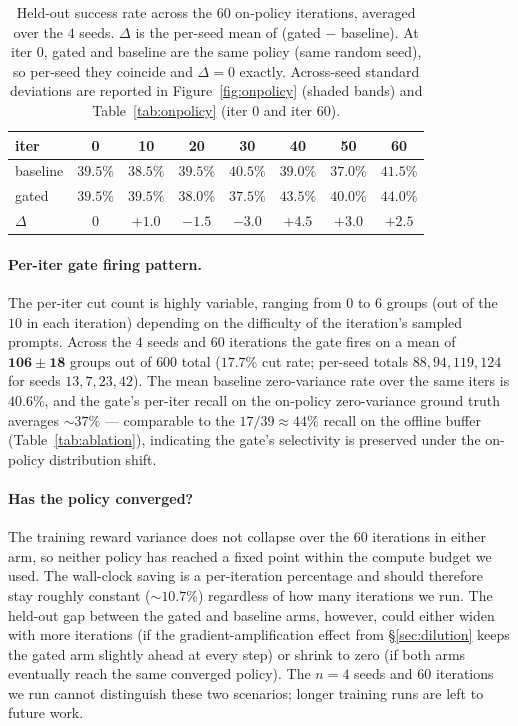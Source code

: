 \documentclass{article}
\begin{document}
\begin{table}[h]
\centering
\caption{Held-out success rate across the $60$ on-policy
iterations, averaged over the $4$ seeds. $\Delta$ is the
per-seed mean of (gated $-$ baseline). At iter $0$, gated and
baseline are the same policy (same random seed), so per-seed
they coincide and $\Delta = 0$ exactly. Across-seed standard
deviations are reported in Figure~\ref{fig:onpolicy} (shaded
bands) and Table~\ref{tab:onpolicy} (iter $0$ and iter $60$).}
\label{tab:onpolicy_eval}
\small
\begin{tabular}{lccccccc}
\toprule
iter      & 0 & 10 & 20 & 30 & 40 & 50 & 60 \\
\midrule
baseline  & $39.5\%$ & $38.5\%$ & $39.5\%$ & $40.5\%$ & $39.0\%$ & $37.0\%$ & $41.5\%$ \\
gated     & $39.5\%$ & $39.5\%$ & $38.0\%$ & $37.5\%$ & $43.5\%$ & $40.0\%$ & $44.0\%$ \\
$\Delta$  & $0$      & $+1.0$   & $-1.5$   & $-3.0$   & $+4.5$   & $+3.0$   & $+2.5$   \\
\bottomrule
\end{tabular}
\end{table}

\paragraph{Per-iter gate firing pattern.}
The per-iter cut count is highly variable, ranging from $0$ to
$6$ groups (out of the $10$ in each iteration) depending on the
difficulty of the iteration's sampled prompts. Across the $4$
seeds and $60$ iterations the gate fires on a mean of
$\mathbf{106\!\pm\!18}$ groups out of $600$ total ($17.7\%$ cut
rate; per-seed totals
$88, 94, 119, 124$ for seeds $13, 7, 23, 42$). The mean baseline
zero-variance rate over the same iters is $40.6\%$, and the
gate's per-iter recall on the on-policy zero-variance ground
truth averages $\sim\!37\%$ --- comparable to the
$17/39\!\approx\!44\%$ recall on the offline buffer
(Table~\ref{tab:ablation}), indicating the gate's selectivity is
preserved under the on-policy distribution shift.

\paragraph{Has the policy converged?}
The training reward variance does not collapse over the $60$
iterations in either arm, so neither policy has reached a fixed
point within the compute budget we used. The wall-clock saving is
a per-iteration percentage and should therefore stay roughly
constant ($\sim\!10.7\%$) regardless of how many iterations we
run. The held-out gap between the gated and baseline arms,
however, could either widen with more iterations (if the
gradient-amplification effect from \S\ref{sec:dilution} keeps
the gated arm slightly ahead at every step) or shrink to zero
(if both arms eventually reach the same converged policy). The
$n\!=\!4$ seeds and $60$ iterations we run cannot distinguish
these two scenarios; longer training runs are left to future
work.
\end{document}
